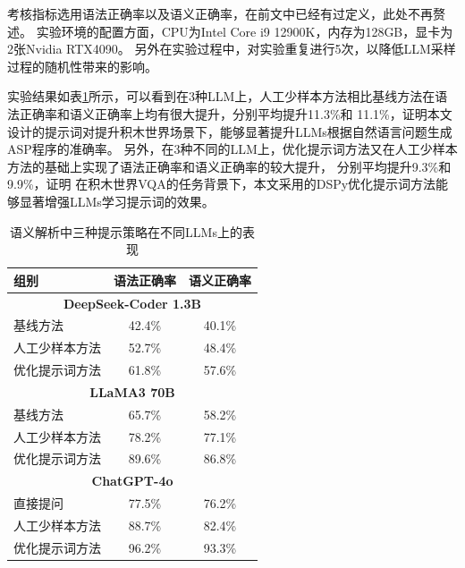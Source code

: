 考核指标选用语法正确率以及语义正确率，在前文中已经有过定义，此处不再赘述。
实验环境的配置方面，CPU为Intel Core i9 12900K，内存为128GB，显卡为2张Nvidia RTX4090。
另外在实验过程中，对实验重复进行5次，以降低LLM采样过程的随机性带来的影响。

实验结果如表\ref{tab:semantic-result}所示，可以看到在3种LLM上，人工少样本方法相比基线方法在语法正确率和语义正确率上均有很大提升，分别平均提升11.3\%和
11.1\%，证明本文设计的提示词对提升积木世界场景下，能够显著提升LLMs根据自然语言问题生成ASP程序的准确率。
另外，在3种不同的LLM上，优化提示词方法又在人工少样本方法的基础上实现了语法正确率和语义正确率的较大提升，
分别平均提升9.3\%和9.9\%，证明
在积木世界VQA的任务背景下，本文采用的DSPy优化提示词方法能够显著增强LLMs学习提示词的效果。
\begin{table}[h]
    \centering
    \begin{tabular}{lcc}
        \toprule
        \textbf{组别} & \textbf{语法正确率} & \textbf{语义正确率} \\
        \midrule
        \multicolumn{3}{c}{\textbf{DeepSeek-Coder 1.3B}} \\
        基线方法 & 42.4\% & 40.1\%\\
        人工少样本方法 & 52.7\% & 48.4\% \\
        优化提示词方法 & 61.8\% & 57.6\% \\
        \midrule
        \multicolumn{3}{c}{\textbf{LLaMA3 70B}} \\
        基线方法 & 65.7\% & 58.2\% \\
        人工少样本方法 & 78.2\% & 77.1\% \\
        优化提示词方法 & 89.6\% & 86.8\% \\
        \midrule
        \multicolumn{3}{c}{\textbf{ChatGPT-4o}} \\
        直接提问 & 77.5\% & 76.2\% \\
        人工少样本方法 & 88.7\% & 82.4\% \\
        优化提示词方法 & 96.2\% & 93.3\% \\
        \bottomrule
    \end{tabular}
    \caption{语义解析中三种提示策略在不同LLMs上的表现}
    \label{tab:semantic-result}
\end{table}

